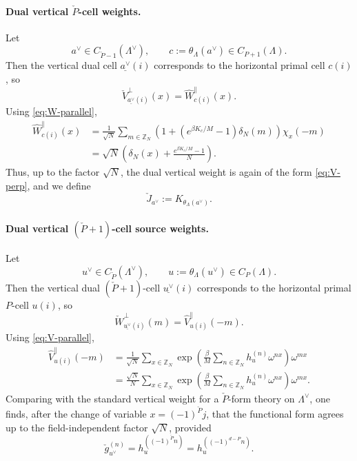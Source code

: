 \documentclass[dvipsnames,a4paper]{article}
\numberwithin{equation}{section}
\theoremstyle{definition}
\theoremstyle{remark}
\begin{document}
\paragraph{Dual vertical \(\check P\)-cell weights.}
Let
\begin{equation}
a^\vee\in C_{\check P-1}(\Lambda^\vee),
\qquad
c:=\theta_\Lambda(a^\vee)\in C_{P+1}(\Lambda).
\end{equation}
Then the vertical dual cell \(\underline{a^\vee}(i)\) corresponds to the horizontal primal
cell \(c(i)\), so
\begin{equation}
	\check V_{\underline{a^\vee}(i)}^{\perp}(x)
	=
	\widehat W_{c(i)}^{\parallel}(x).
\end{equation}
Using \eqref{eq:W-parallel},
\begin{align}
	\widehat W_{c(i)}^{\parallel}(x)
	&=
	\frac{1}{\sqrt N}\sum_{m\in \mathbb Z_N}
	\left(
	1+\left(e^{\beta K_c/M}-1\right)\delta_N(m)
	\right)\chi_x(-m)
	\nonumber\\
	&=
	\sqrt N
	\left(
	\delta_N(x)+\frac{e^{\beta K_c/M}-1}{N}
	\right).
	\label{eq:KW-dual-vertical-V-explicit}
\end{align}
Thus, up to the factor \(\sqrt N\), the dual vertical weight is again of the form
\eqref{eq:V-perp}, and we define
\begin{equation}
	\check J_{a^\vee}:=K_{\theta_\Lambda(a^\vee)}.
	\label{eq:KW-dual-J-def}
\end{equation}

\paragraph{Dual vertical \((\check P+1)\)-cell source weights.}
Let
\begin{equation}
u^\vee\in C_{\check P}(\Lambda^\vee),
\qquad
u:=\theta_\Lambda(u^\vee)\in C_P(\Lambda).
\end{equation}
Then the vertical dual \((\check P+1)\)-cell \(\underline{u^\vee}(i)\) corresponds to the
horizontal primal \(P\)-cell \(u(i)\), so
\begin{equation}
	\check W_{\underline{u^\vee}(i)}^{\perp}(m)
	=
	\widehat V_{u(i)}^{\parallel}(-m).
\end{equation}
Using \eqref{eq:V-parallel},
\begin{align}
	\widehat V_{u(i)}^{\parallel}(-m)
	&=
	\frac{1}{\sqrt N}\sum_{x\in \mathbb Z_N}
	\exp \left(\frac{\beta}{M}\sum_{n\in\mathbb Z_N}h_u^{(n)}\omega^{nx}\right)\omega^{mx}
	\nonumber\\
	&=
	\frac{\sqrt N}{N}\sum_{x\in \mathbb Z_N}
	\exp \left(\frac{\beta}{M}\sum_{n\in\mathbb Z_N}h_u^{(n)}\omega^{nx}\right)\omega^{mx}.
	\label{eq:KW-dual-vertical-W-first}
\end{align}
Comparing with the standard vertical weight for a \(\check P\)-form theory on
\(\Lambda^\vee\), one finds, after the change of variable \(x=(-1)^{\check P}j\), that the
functional form agrees up to the field-independent factor \(\sqrt N\), provided
\begin{equation}
	\check g_{u^\vee}^{(n)}
	=
	h_{u}^{((-1)^{\check P}n)}
	=
	h_{u}^{((-1)^{d-P}n)}.
	\label{eq:KW-dual-g-def}
\end{equation}
\end{document}
